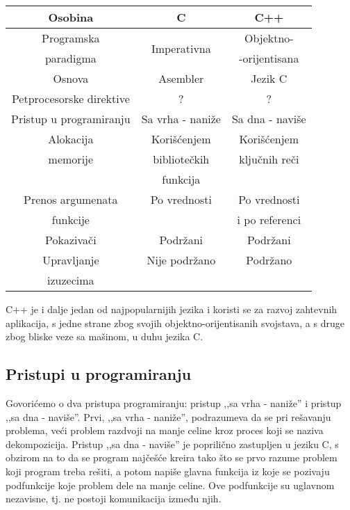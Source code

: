 \documentclass[a4paper]{article}
\begin{document}
{%
\begin{tabular}{|c|c|c|}
\hline
Osobina & C & C++ \\
\hline
Programska & \multirow{2}{5em}{Imperativna} & Objektno- \\
paradigma & & -orijentisana\\
\hline
Osnova & Asembler & Jezik C \\
\hline
Petprocesorske direktive & ? & ?\\
\hline
Pristup u programiranju & Sa vrha - naniže & Sa dna - naviše\\
\hline
Alokacija & Korišćenjem  & Korišćenjem \\
memorije & bibliotečkih & ključnih reči\\
& funkcija &\\
\hline
Prenos argumenata & Po vrednosti & Po vrednosti\\
funkcije & & i po referenci\\
\hline
Pokazivači & Podržani & Podržani\\
\hline
Upravljanje & Nije podržano & Podržano \\
izuzecima & &\\
\hline
\end{tabular}

 C++ je i dalje jedan od najpopularnijih jezika i koristi se za razvoj zahtevnih aplikacija, s jedne strane zbog svojih objektno-orijentisanih svojstava, a s druge zbog bliske veze sa mašinom, u duhu jezika C.

\subsection{Pristupi u programiranju}

Govorićemo o dva pristupa programiranju: pristup ,,sa vrha - naniže'' i pristup ,,sa dna - naviše''. Prvi, ,,sa vrha - naniže'', podrazumeva da se pri rešavanju problema, veći problem razdvoji na manje celine kroz proces koji se naziva dekompozicija. Pristup ,,sa dna - naviše'' je poprilično zastupljen u jeziku C, s obzirom na to da se program najčešće kreira tako što se prvo razume problem koji program treba rešiti, a potom napiše glavna funkcija iz koje se pozivaju podfunkcije koje problem dele na manje celine. Ove podfunkcije su uglavnom nezavisne, tj. ne postoji komunikacija između njih.

}
\end{document}
